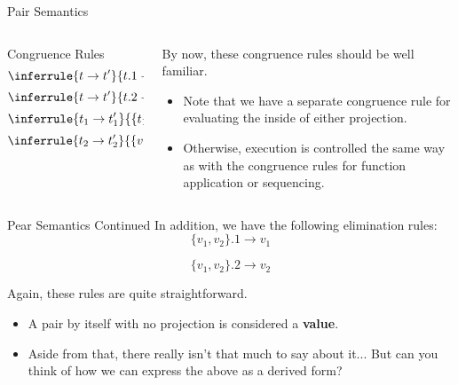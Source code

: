 \documentclass[11pt]{beamer}
\begin{document}
\begin{frame}[fragile=singleslide]{Pair Semantics}
\begin{columns}
\begin{column}{0.5\textwidth}
Congruence Rules
\begin{equation}
\inferrule{t \rightarrow t'}{t.1 \rightarrow t'.1} \tag{E-Proj1}
\end{equation}
\begin{equation}
\inferrule{t \rightarrow t'}{t.2 \rightarrow t'.2} \tag{E-Proj2}
\end{equation}
\begin{equation}
\inferrule{t_1 \rightarrow t_1'}{\{t_1,t_2\} \rightarrow \{t_1',t_2\}} \tag{E-Pair1}
\end{equation}
\begin{equation}
\inferrule{t_2 \rightarrow t_2'}{\{v_1,t_2\} \rightarrow \{v_1,t_2'\}} \tag{E-Pair2}
\end{equation}
\end{column}
\begin{column}{0.5\textwidth}
By now, these congruence rules should be well familiar.  
\begin{itemize}
\item Note that we have a separate congruence rule for evaluating the inside of either projection.  
\item Otherwise, execution is controlled the same way as with the congruence rules for function application or sequencing.
\end{itemize}
\end{column}
\end{columns}
\end{frame}


\begin{frame}[fragile=singleslide]{Pear Semantics Continued}
In addition, we have the following elimination rules:
\begin{equation}
\{v_1, v_2\}.1 \rightarrow v_1 \tag{E-PairBeta1}
\end{equation}

\begin{equation}
\{v_1, v_2\}.2 \rightarrow v_2 \tag{E-PairBeta2}
\end{equation}

Again, these rules are quite straightforward.
\begin{itemize}
\item A pair by itself with no projection is considered a \textbf{value}. 
\item Aside from that, there really isn't that much to say about it... But can you think of how we can express the above as a derived form?
\end{itemize}
\end{frame}
\end{document}

